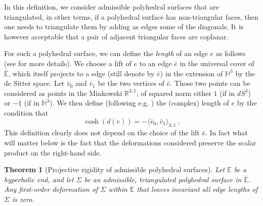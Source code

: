 \documentclass[notitlepage,twoside,a4paper]{amsart}
\newtheorem{theorem}{\rm\bf Theorem}[section]
\theoremstyle{named}
\newcommand{\HH}{{\mathbb H}}
\newcommand{\R}{{\mathbb R}}
\newcommand{\bE}{{\mathbb E}}
\begin{document}
In this definition, we consider admissible polyhedral surfaces that are triangulated, in other terms, if a polyhedral surface has non-triangular faces, then one needs to triangulate them by adding as edges some of the diagonals. It is however acceptable that a pair of adjacent triangular faces are coplanar.

For such a polyhedral surface, we can define the {\em length} of an edge $e$ as follows (see \cite{shu} for more details). We choose a lift of $e$ to an edge $\bar e$ in the universal cover of $\bar \bE$, which itself projects to a edge (still denote by $\bar e$) in the extension of $\HH^3$ by the de Sitter space. Let $\bar v_0$ and $\bar v_1$ be the two vertices of $\bar e$. Those two points can be considered as points in the Minkowski $\R^{3,1}$, of squared norm either $1$ (if in $dS^3$) or $-1$ (if in $\HH^3$). We then define (following e.g. \cite{shu}) the (complex) length of $e$ by the condition that
$$ \cosh(d(e)) = - \langle \bar v_0, \bar v_1\rangle_{3,1}~. $$
This definition clearly does not depend on the choice of the lift $\bar e$. In fact what will matter below is the fact that the deformations considered preserve the scalar product on the right-hand side.

\begin{theorem}[Projective rigidity of admissible polyhedral surfaces] \label{tm:proj-general}
  Let $\bE$ be a hyperbolic end, and let $\Sigma$ be an admissible, triangulated polyhedral surface in $\bar \bE$. Any first-order deformation of $\Sigma$ within $\bE$ that leaves invariant all edge lengths of $\Sigma$ is zero.
\end{theorem}
\end{document}
